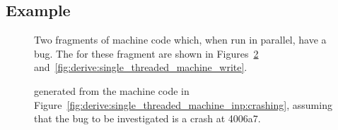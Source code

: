 \subsection{Example}
\label{sect:derive:simple_toctou_example}

\begin{figure}
  \caption{Two fragments of machine code which, when run in parallel,
    have a bug.  The {\StateMachines} for these fragment are shown in
    Figures~\ref{fig:derive:single_threaded_machine}
    and~\ref{fig:derive:single_threaded_machine_write}.}
  \label{fig:derive:single_threaded_machine_inp}
\end{figure}

\begin{figure}
  \begin{center}
    
  \end{center}
  \caption{{\StateMachine} generated from the machine code in
    Figure~\ref{fig:derive:single_threaded_machine_inp:crashing},
    assuming that the bug to be investigated is a crash at
    4006a7.}
  \label{fig:derive:single_threaded_machine}
\end{figure}

